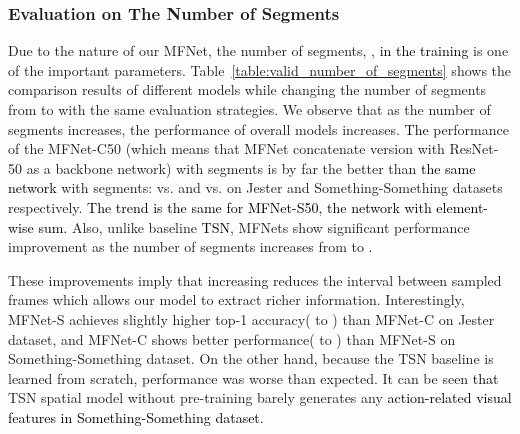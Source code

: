 \documentclass[runningheads]{llncs}
\newcommand{\nj}[1]{\textcolor{black}{#1}}
\begin{document}
\subsubsection{Evaluation on The Number of Segments}
Due to the nature of our MFNet, the number of segments, , \nj{in the training} is one of the important parameters. Table~\ref{table:valid_number_of_segments} shows the comparison results of different models while changing the number of segments from  to  with the same evaluation strategies. 
We observe that as the number of segments increases, the performance of overall models increases. \nj{The} performance of the MFNet-C50 (which means that MFNet concatenate version with ResNet-50 as a backbone network) with  segments is by far the better than \nj{the same network} with  segments:  vs.  and  vs.  on Jester and Something-Something datasets respectively. \nj{The trend is the same for MFNet-S50, the network with element-wise sum.} Also, unlike baseline \nj{TSN}, MFNets show significant performance improvement as the number of segments increases from  to . 

These improvements imply that increasing  reduces the interval between sampled frames which allows our model to extract richer information. Interestingly, MFNet-S achieves slightly higher top-1 accuracy( to ) than MFNet-C on Jester dataset, and MFNet-C shows better performance( to ) than MFNet-S on Something-Something dataset. On the other hand, because the TSN baseline is learned from scratch, performance was worse than expected. It can be seen \nj{that} TSN spatial model without pre-training barely generates any \nj{action-related visual features in Something-Something dataset.
}
\end{document}
